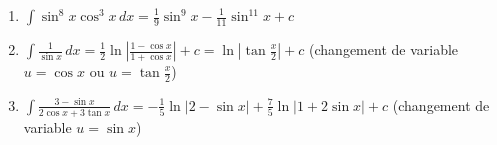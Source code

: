 {\begin{enumerate}
{\begin{enumerate}
  \item $\int \sin ^8x\cos ^3x \, dx=\frac 19\sin ^9x-\frac 1{11}\sin ^{11}x+c$

  \item $\int \frac 1{\sin x} \, dx=\frac 12\ln \left| \frac{1-\cos x}{1+\cos x}%
\right| +c=\ln \left| \tan \frac x2\right| +c$ (changement de variable $u=\cos x$ ou $u=\tan \frac
x2$)

  \item $\int \frac{3-\sin x}{2\cos x+3\tan x}\,dx=-\frac 15\ln |2-\sin x| + \frac 75 \ln |1+2\sin x| + c$  
(changement de variable $u=\sin x$)
\end{enumerate}}
\end{enumerate}
}
